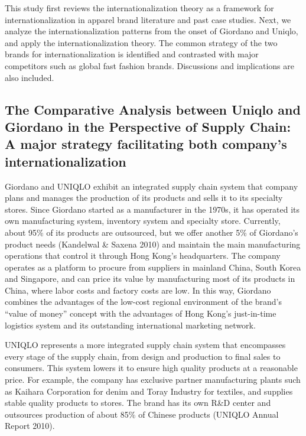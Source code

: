 \documentclass[12pt,]{article}
\begin{document}
This study first reviews the internationalization theory as a framework
for internationalization in apparel brand literature and past case
studies. Next, we analyze the internationalization patterns from the
onset of Giordano and Uniqlo, and apply the internationalization theory.
The common strategy of the two brands for internationalization is
identified and contrasted with major competitors such as global fast
fashion brands. Discussions and implications are also included.

\hypertarget{the-comparative-analysis-between-uniqlo-and-giordano-in-the-perspective-of-supply-chain-a-major-strategy-facilitating-both-companys-internationalization}{%
\subsection{The Comparative Analysis between Uniqlo and Giordano in the
Perspective of Supply Chain: A major strategy facilitating both
company's
internationalization}\label{the-comparative-analysis-between-uniqlo-and-giordano-in-the-perspective-of-supply-chain-a-major-strategy-facilitating-both-companys-internationalization}}

Giordano and UNIQLO exhibit an integrated supply chain system that
company plans and manages the production of its products and sells it to
its specialty stores. Since Giordano started as a manufacturer in the
1970s, it has operated its own manufacturing system, inventory system
and specialty store. Currently, about 95\% of its products are
outsourced, but we offer another 5\% of Giordano's product needs
(Kandelwal \& Saxena 2010) and maintain the main manufacturing
operations that control it through Hong Kong's headquarters. The company
operates as a platform to procure from suppliers in mainland China,
South Korea and Singapore, and can price its value by manufacturing most
of its products in China, where labor costs and factory costs are low.
In this way, Giordano combines the advantages of the low-cost regional
environment of the brand's ``value of money'' concept with the
advantages of Hong Kong's just-in-time logistics system and its
outstanding international marketing network.

UNIQLO represents a more integrated supply chain system that encompasses
every stage of the supply chain, from design and production to final
sales to consumers. This system lowers it to ensure high quality
products at a reasonable price. For example, the company has exclusive
partner manufacturing plants such as Kaihara Corporation for denim and
Toray Industry for textiles, and supplies stable quality products to
stores. The brand has its own R\&D center and outsources production of
about 85\% of Chinese products (UNIQLO Annual Report 2010).
\end{document}
